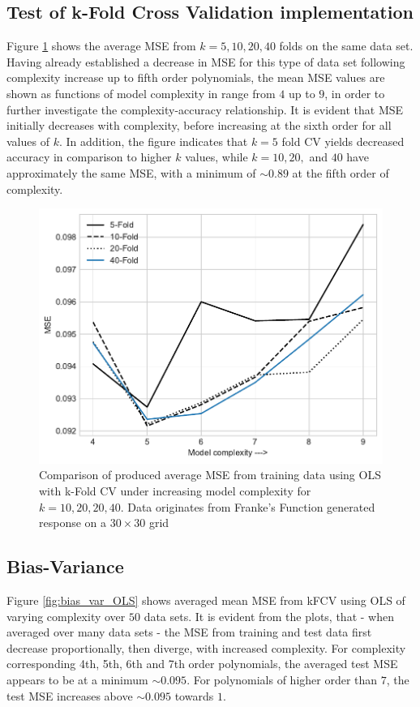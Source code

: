 \documentclass[%
oneside,                 %
final,                   %
10pt]{article}
\begin{document}
\subsection{Test of k-Fold Cross Validation implementation}
Figure \ref{fig:kfold_kval} shows the average MSE from $k=5,10,20,40$ folds on the same data set. Having already established a decrease in MSE for this type of data set following complexity increase up to fifth order polynomials, the mean MSE values are shown as functions of model complexity in range from $4$ up to $9$, in order to further investigate the complexity-accuracy relationship. It is evident that MSE initially decreases with complexity, before increasing at the sixth order for all values of $k$. In addition, the figure indicates that $k=5$ fold CV yields decreased accuracy in comparison to higher $k$ values, while $k=10,20,$ and $40$ have approximately the same MSE, with a minimum of $\sim 0.89$ at the fifth order of complexity.


\begin{figure}[!h]
        \centering 
         \includegraphics[scale=0.7]{../Results/Part_b/kfold_foldeval.pdf} 
        \caption{Comparison of produced average MSE from training data using OLS with k-Fold CV under increasing model complexity for $k=10,20,20,40$. Data originates from Franke's Function generated response on a $30\times 30$ grid}
        \label{fig:kfold_kval}   
\end{figure}  


\subsection{Bias-Variance}
Figure \ref{fig:bias_var_OLS} shows averaged mean MSE from kFCV using OLS of varying complexity over $50$ data sets. It is evident from the plots, that - when averaged over many data sets - the MSE from training and test data first decrease proportionally, then diverge, with increased complexity.  For complexity corresponding 4th, 5th, 6th and 7th order polynomials, the averaged test MSE appears to be at a minimum $\sim 0.095$. For polynomials of higher order than $7$, the test MSE increases above $\sim 0.095$ towards $1$.
\end{document}
